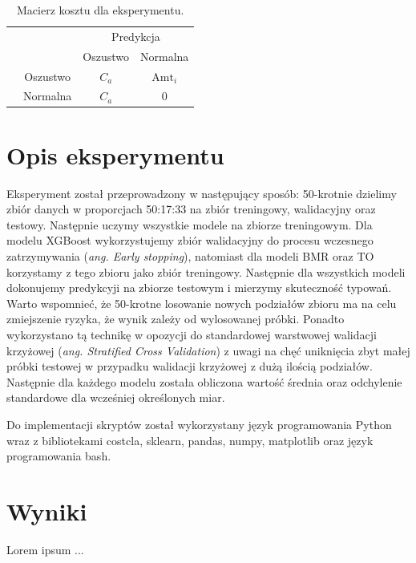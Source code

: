 \documentclass[inzynierska]{pwr_wmat_praca_dyplomowa}
\theoremstyle{plain}
\numberwithin{theorem}{chapter}
\theoremstyle{definition}
\numberwithin{theorem}{chapter}
\begin{document}
\begin{table}[h]
	\begin{center}
		\makegapedcells
		\begin{tabular}{cc|cc}
			\multicolumn{2}{c}{}     &   \multicolumn{2}{c}{Predykcja} \\
			&            &   Oszustwo &   Normalna     \\ 
			\cline{2-4}
			\multirow{2}{*}{\rotatebox[origin=c]{90}{Prawda}} & Oszustwo   & $C_a$         & $\text{Amt}_i$              \\
			& Normalna   & $C_a$         & $0$              \\ 
			\cline{2-4}
		\end{tabular}
	\end{center}
	\caption{Macierz kosztu dla eksperymentu.}
	\label{macierz-kosztu-eksperyment}
\end{table}

\section{Opis eksperymentu}
Eksperyment został przeprowadzony w następujący sposób:
50-krotnie dzielimy zbiór danych w proporcjach 50:17:33 na zbiór treningowy, walidacyjny oraz testowy. Następnie uczymy wszystkie modele na zbiorze treningowym. Dla modelu XGBoost wykorzystujemy zbiór walidacyjny do procesu wczesnego zatrzymywania (\textit{ang. Early stopping}), natomiast dla modeli BMR oraz TO korzystamy z tego zbioru jako zbiór treningowy. Następnie dla wszystkich modeli dokonujemy predykcyji na zbiorze testowym i mierzymy skuteczność typowań. Warto wspomnieć, że 50-krotne losowanie nowych podziałów zbioru ma na celu zmiejszenie ryzyka, że wynik zależy od wylosowanej próbki. Ponadto wykorzystano tą technikę w opozycji do standardowej warstwowej walidacji krzyżowej (\textit{ang. Stratified Cross Validation}) z uwagi na chęć uniknięcia zbyt małej próbki testowej w przypadku walidacji krzyżowej z dużą ilością podziałów. Następnie dla każdego modelu została obliczona wartość średnia oraz odchylenie standardowe dla wcześniej określonych miar.

Do implementacji skryptów został wykorzystany język programowania Python wraz z bibliotekami costcla, sklearn, pandas, numpy, matplotlib oraz język programowania bash.

\section{Wyniki}
Lorem ipsum ...
\end{document}
